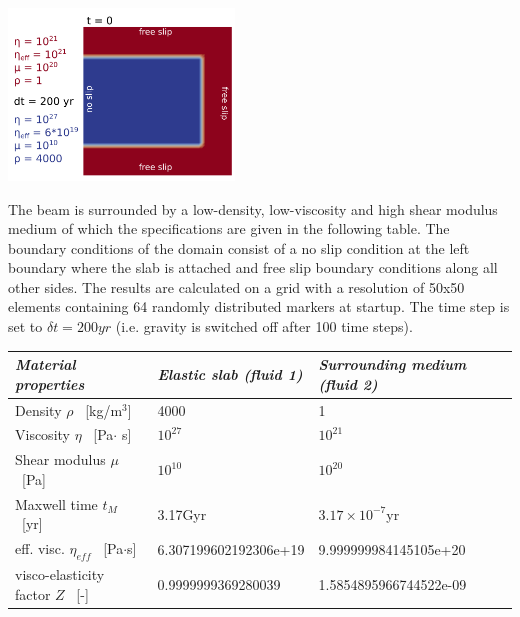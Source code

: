 \begin{center}
\includegraphics[width=6cm]{images/viscoelasticity/poster_benchmark.png}\\
\end{center}

The beam is surrounded by a low-density, low-viscosity and high shear modulus medium
of which the specifications are given in  the following table.
The boundary conditions of the domain consist of a no slip condition at
the left boundary where the slab is attached and free slip boundary conditions along all other sides.
The results are calculated on a grid with a resolution of 50x50 elements containing 64 randomly distributed markers at startup.
The time step is set to $\delta t = 200yr$ (i.e. gravity is switched off after 100 time steps).

\begin{center}
\begin{tabular}{lll}
\hline
\textit{Material properties}& \textit{Elastic slab (fluid 1)}  & \textit{Surrounding medium (fluid 2)} \\
\hline
\hline
Density         $\rho$ \     [kg/m$^{3}$]      & 4000                    & 1     \\
Viscosity       $\eta$ \    [Pa$\cdot$ s]      & $10^{27}$               &   $10^{21}$     \\
Shear modulus   $\mu $ \    [Pa]               & $10^{10}$               & $10^{20}$       \\
Maxwell time $t_M$     \    [yr]               & 3.17Gyr                 &  $3.17\times10^{-7}$yr       \\
eff. visc.      $\eta_{eff}$ \ [Pa$\cdot$s]    & 6.307199602192306e+19   &  9.999999984145105e+20      \\
visco-elasticity factor $Z$      \ [-]         & 0.9999999369280039      &  1.5854895966744522e-09     \\
\hline
\end{tabular}
\end{center}








